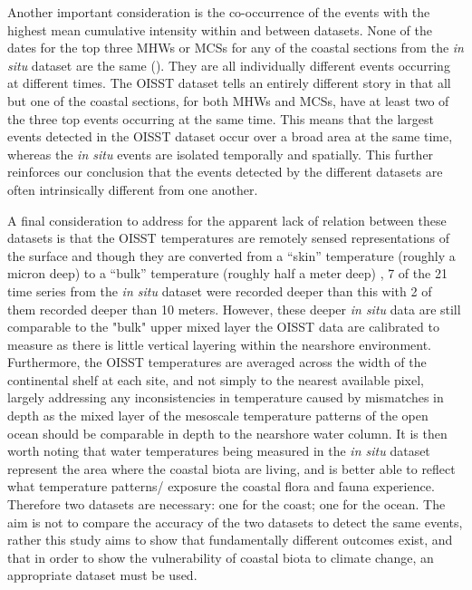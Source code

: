 \documentclass[a4paper,10pt,review]{elsarticle}
\begin{document}
Another important consideration is the co-occurrence of the events with the highest mean cumulative intensity within and between datasets. None of the dates for the top three MHWs or MCSs for any of the coastal sections from the \emph{in situ} dataset are the same (). They are all individually different events occurring at different times. The OISST dataset tells an entirely different story in that all but one of the coastal sections, for both MHWs and MCSs, have at least two of the three top events occurring at the same time. This means that the largest events detected in the OISST dataset occur over a broad area at the same time, whereas the \emph{in situ} events are isolated temporally and spatially. This further reinforces our conclusion that the events detected by the different datasets are often intrinsically different from one another.

A final consideration to address for the apparent lack of relation between these datasets is that the OISST temperatures are remotely sensed representations of the surface and though they are converted from a ``skin'' temperature (roughly a micron deep) to a ``bulk'' temperature (roughly half a meter deep) \citep{Reynolds2007}, 7 of the 21 time series from the \emph{in situ} dataset were recorded deeper than this with 2 of them recorded deeper than 10 meters. However, these deeper \emph{in situ} data are still comparable to the "bulk" upper mixed layer the OISST data are calibrated to measure as there is little vertical layering within the nearshore environment. Furthermore, the OISST temperatures are averaged across the width of the continental shelf at each site, and not simply to the nearest available pixel, largely addressing any inconsistencies in temperature caused by mismatches in depth as the mixed layer of the mesoscale temperature patterns of the open ocean should be comparable in depth to the nearshore water column. It is then worth noting that water temperatures being measured in the \emph{in situ} dataset represent the area where the coastal biota are living, and is better able to reflect what temperature patterns/ exposure the coastal flora and fauna experience. Therefore two datasets are necessary: one for the coast; one for the ocean. The aim is not to compare the accuracy of the two datasets to detect the same events, rather this study aims to show that fundamentally different outcomes exist, and that in order to show the vulnerability of coastal biota to climate change, an appropriate dataset must be used.
\end{document}
